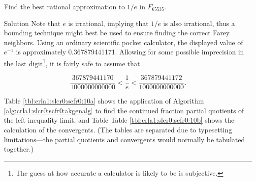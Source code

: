 \begin{vworkexamplestatement}
\label{ex:crla1:slcr0:scfr0:10}
Find the best rational approximation to $1/e$ in $F_{65535}$.
\end{vworkexamplestatement}
\begin{vworkexampleparsection}{Solution} Note that $e$ is irrational, implying
that $1/e$ is also irrational, thus a bounding technique might best be used
to ensure finding the correct Farey neighbors.  Using an ordinary scientific pocket
calculator, the displayed value of $e^{-1}$ is approximately 0.367879441171.
Allowing for some possible imprecision in the last digit\footnote{The guess at 
how accurate a calculator is likely to be is subjective.}, it is fairly safe to assume that

\begin{equation}
\label{eq:ex:crla1:slcr0:scfr0:10:01}
\frac{367879441170}{1000000000000} < \frac{1}{e} < \frac{367879441172}{1000000000000} .
\end{equation}

Table \ref{tbl:crla1:slcr0:scfr0:10a} shows the application of 
Algorithm \ref{alg:crla1:slcr0:scfr0:akgenalg} to find the
continued fraction partial quotients of the left inequality
limit, and Table Table \ref{tbl:crla1:slcr0:scfr0:10b} shows the
calculation of the convergents.  (The tables are separated due to typesetting
limitations---the partial quotients and convergents would normally be tabulated
together.)


\end{vworkexampleparsection}
